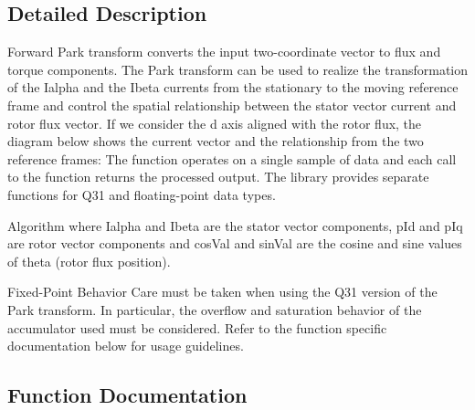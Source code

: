\subsection{Detailed Description}
Forward Park transform converts the input two-\/coordinate vector to flux and torque components. The Park transform can be used to realize the transformation of the {\ttfamily Ialpha} and the {\ttfamily Ibeta} currents from the stationary to the moving reference frame and control the spatial relationship between the stator vector current and rotor flux vector. If we consider the d axis aligned with the rotor flux, the diagram below shows the current vector and the relationship from the two reference frames\+:  The function operates on a single sample of data and each call to the function returns the processed output. The library provides separate functions for Q31 and floating-\/point data types. \begin{DoxyParagraph}{Algorithm}
 where {\ttfamily Ialpha} and {\ttfamily Ibeta} are the stator vector components, {\ttfamily p\+Id} and {\ttfamily p\+Iq} are rotor vector components and {\ttfamily cos\+Val} and {\ttfamily sin\+Val} are the cosine and sine values of theta (rotor flux position). 
\end{DoxyParagraph}
\begin{DoxyParagraph}{Fixed-\/\+Point Behavior}
Care must be taken when using the Q31 version of the Park transform. In particular, the overflow and saturation behavior of the accumulator used must be considered. Refer to the function specific documentation below for usage guidelines. 
\end{DoxyParagraph}


\subsection{Function Documentation}

